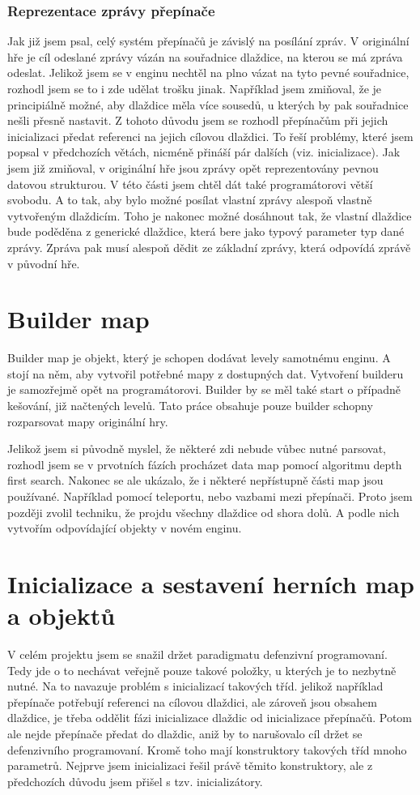 \subsubsection{Reprezentace zprávy přepínače}
Jak již jsem psal,  celý systém přepínačů je závislý na posílání zpráv. V originální hře je cíl odeslané zprávy vázán na souřadnice dlaždice, na kterou 
se má zpráva odeslat. Jelikož jsem se v enginu nechtěl na plno vázat na tyto pevné souřadnice, rozhodl jsem se to i 
zde udělat trošku jinak. Například jsem zmiňoval, že je principiálně možné, aby dlaždice měla více sousedů, u kterých by pak souřadnice
nešli přesně nastavit. Z tohoto důvodu jsem se rozhodl přepínačům při jejich inicializaci předat referenci na jejich cílovou dlaždici. 
To řeší problémy, které jsem popsal v předchozích větách, nicméně přináší pár dalších (viz. inicializace). Jak jsem již zmiňoval,
v originální hře jsou zprávy opět reprezentovány pevnou datovou strukturou. V této části jsem chtěl dát také programátorovi větší svobodu. 
A to tak, aby bylo možné posílat vlastní zprávy alespoň vlastně vytvořeným dlaždicím. Toho je nakonec možné dosáhnout tak, že vlastní dlaždice bude 
poděděna z generické dlaždice, která bere jako typový parameter typ dané zprávy. Zpráva pak musí alespoň dědit ze základní zprávy, která odpovídá
zprávě v původní hře.

\section{Builder map}
Builder map je objekt, který je schopen dodávat levely samotnému enginu. A stojí na něm, aby vytvořil potřebné mapy z dostupných dat.
Vytvoření builderu je samozřejmě opět na programátorovi. Builder by se měl také start o případně kešování, již načtených levelů. 
Tato práce obsahuje pouze builder schopny rozparsovat mapy originální hry.

Jelikož jsem si původně myslel, že některé zdi nebude vůbec nutné parsovat, rozhodl jsem se v prvotních fázích procházet data map
pomocí algoritmu depth first search. Nakonec se ale ukázalo, že i některé nepřístupně části map jsou používané. 
Například pomocí teleportu, nebo vazbami mezi přepínači. Proto jsem později zvolil techniku, že projdu všechny dlaždice od shora dolů. 
A podle nich vytvořím odpovídající objekty v novém enginu.

\section{Inicializace a sestavení herních map a objektů}
V celém projektu jsem se snažil držet paradigmatu defenzivní programovaní. Tedy jde o to nechávat veřejně pouze takové položky, u kterých
je to nezbytně nutné. Na to navazuje problém s inicializací takových tříd. jelikož například přepínače potřebují referenci na cílovou dlaždici, ale zároveň
jsou obsahem dlaždice, je třeba oddělit fázi inicializace dlaždic od inicializace přepínačů. Potom ale nejde přepínače předat do dlaždic,
aniž by to narušovalo cíl držet se defenzivního programovaní. Kromě toho mají konstruktory takových tříd mnoho parametrů. Nejprve jsem 
inicializaci řešil právě těmito konstruktory, ale z předchozích důvodu jsem přišel s tzv. inicializátory.

